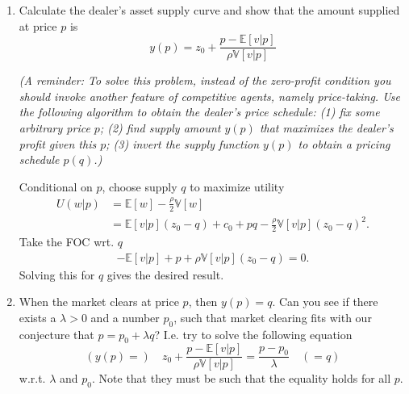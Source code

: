 \documentclass[11pt
, answers
]{exam}
\begin{document}
\begin{enumerate}[label=(\alph*). ]
\item Calculate the dealer's asset supply curve and show that the amount supplied at price $p$ is
\[
y(p) =z_{0} +  \frac{p - \mathbb{E}[v|p]}{\rho \mathbb{V}[v|p]} 
\]

\emph{(A reminder: To solve this problem, instead of the zero-profit condition you should invoke another feature of competitive agents, namely price-taking. Use the following algorithm to obtain the dealer's price schedule: (1) fix some arbitrary price $p$; (2) find supply amount $y(p)$ that maximizes the dealer's profit given this $p$; (3) invert the supply function $y(p)$ to obtain a pricing schedule $p(q)$.)}

\begin{solution}
Conditional on $p$, choose supply $q$ to maximize utility
\begin{align*}
U(w|p) 
& = \mathbb{E}[w] - \frac{\rho}{2} \mathbb{V}[w] \\
& = \mathbb{E}[v|p](z_{0}-q) + c_{0}+pq - \frac{\rho}{2} \mathbb{V}[v|p](z_{0}-q)^{2}.
\end{align*}
Take the FOC wrt. $q$
\begin{align*}
	-\mathbb{E}[v|p] + p +\rho\mathbb{V}[v|p](z_{0}-q) = 0.
\end{align*}
Solving this for $q$ gives the desired result.
\end{solution}


\item When the market clears at price $p$, then $y(p)=q$. Can you see if there exists a $\lambda>0$ and a number $p_{0}$, such that market clearing fits with our conjecture that $p=p_{0}+\lambda q$? I.e. try to solve the following equation
\[
(y(p)=) \quad z_{0} +  \frac{p - \mathbb{E}[v|p]}{\rho \mathbb{V}[v|p]} = \frac{p-p_{0}}{\lambda} \quad (=q)
\]
w.r.t. $\lambda$ and $p_0$. Note that they must be such that the equality holds for all $p$.


\end{enumerate}
\end{document}

